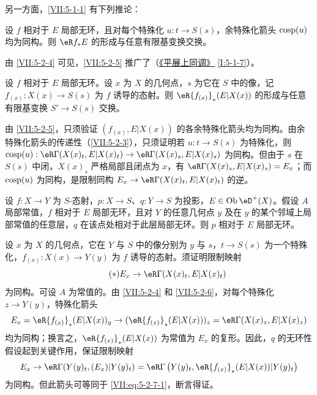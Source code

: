另一方面，\ref{VII:5-1-1} 有下列推论：

\begin{proposition}\label{VII:5-2-5}
设 $f$ 相对于 $E$ 局部无环，且对每个特殊化 $u:t\to S(s)$，余特殊化箭头 $\operatorname{cosp}(u)$ 均为同构。则 $\eR f_\ast E$ 的形成与任意有限基变换交换。
\end{proposition}

由 \ref{VII:5-2-4} 可见，\ref{VII:5-2-5} 推广了（\hyperref[I]{《平展上同调》} \ref{I:5-1-7}）。

\begin{corollary}\label{VII:5-2-6}
设 $f$ 相对于 $E$ 局部无环。设 $x$ 为 $X$ 的几何点，$s$ 为它在 $S$ 中的像，记 $f_{(x)}:X(x)\to S(s)$ 为 $f$ 诱导的态射。则 $\eR {f_{(x)}}_\ast(E|X(x))$ 的形成与任意有限基变换 $S'\to S(s)$ 交换。
\end{corollary}

由 \ref{VII:5-2-5}，只须验证 $(f_{(x)},E|X(x))$ 的各余特殊化箭头均为同构。由余特殊化箭头的传递性（\ref{VII:5-2-3}），只须证明若 $u:t\to S(s)$ 为特殊化，则 $\cosp(u):\eR\Gamma(X(x)_t,E|X(x)_t)\to \eR\Gamma(X(x)_s,E|X(x)_s)$ 为同构。但由于 $s$ 在 $S(s)$ 中闭，$X(x)_s$ 严格局部且闭点为 $x$，有 $\eR\Gamma(X(x)_s,E|X(x)_s)=E_x$；而 $\operatorname{cosp}(u)$ 为同构，是限制同构 $E_x\to \eR\Gamma(X(x)_t,E|X(x)_t)$ 的逆。

\begin{corollary}\label{VII:5-2-7}
设 $f:X\to Y$ 为 $S$-态射，$p:X\to S$、$q:Y\to S$ 为投影，$E\in\ob\eD^+(X)$。假设 $A$ 局部常值，$f$ 相对于 $E$ 局部无环，且对 $Y$ 的任意几何点 $y$ 及在 $y$ 的某个邻域上局部常值的任意层，$q$ 在该点处相对于此层局部无环。则 $p$ 相对于 $E$ 局部无环。
\end{corollary}

设 $x$ 为 $X$ 的几何点，它在 $Y$ 与 $S$ 中的像分别为 $y$ 与 $s$，$t\to S(s)$ 为一个特殊化，$f_{(x)}:X(x)\to Y(y)$ 为 $f$ 诱导的态射。须证明限制映射
\begin{equation*}\tag{$*$}\label{VII:eq:5-2-7-1}
  E_x \to \eR\Gamma(X(x)_t,E|X(x)_t)
\end{equation*}
为同构。可设 $A$ 为常值的。由 \ref{VII:5-2-4} 和 \ref{VII:5-2-6}，对每个特殊化 $z\to Y(y)$，特殊化箭头
\[
  E_x = \eR {f_{(x)}}_\ast (E|X(x))_y \to (\eR {f_{(x)}}_\ast (E|X(x)))_z = \eR\Gamma(X(x)_z,E|X(x)_z)
\]
均为同构；换言之，$\eR{f_{(x)}}_\ast(E|X(x))$ 为常值为 $E_x$ 的复形。因此，$q$ 的无环性假设起到关键作用，保证限制映射
\[
  E_x \to \eR\Gamma(Y(y)_t,(E_x)|Y(y)_t) = \eR\Gamma\left(Y(y)_t,\eR {f_{(x)}}_\ast (E|X(x))|Y(y)_t\right)
\]
为同构。但此箭头可等同于 \eqref{VII:eq:5-2-7-1}，断言得证。

